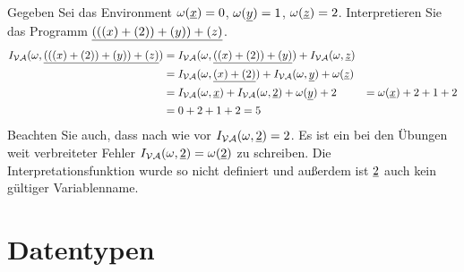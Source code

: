 \begin{bsp}
Gegeben Sei das Environment $\omega(\underline{x})=0$, $\omega(\underline{y})=1$, $\omega(\underline{z})=2$.
Interpretieren Sie das Programm $\underline{(((x)+(2))+(y))+(z)}$.
\begin{align*}
I_{\mathcal{VA}}(\omega,\underline{(((x)+(2))+(y))+(z)}) &= I_{\mathcal{VA}}(\omega,\underline{((x)+(2))+(y)}) + I_{\mathcal{VA}}(\omega,\underline{z}) \\
&= I_{\mathcal{VA}}(\omega,\underline{(x)+(2)}) + I_{\mathcal{VA}}(\omega,\underline{y}) + \omega(\underline{z}) \\
&= I_{\mathcal{VA}}(\omega,\underline{x}) + I_{\mathcal{VA}}(\omega,\underline{2}) + \omega(\underline{y}) + 2
&= \omega(\underline{x}) + 2 + 1 + 2 \\
&= 0 + 2 + 1 + 2 = 5
\end{align*}
Beachten Sie auch, dass nach wie vor $I_{\mathcal{VA}}(\omega,\underline{2})=2$.
Es ist ein bei den Übungen weit verbreiteter Fehler $I_{\mathcal{VA}}(\omega,\underline{2}) = \omega(\underline{2})$ zu schreiben. Die Interpretationsfunktion wurde so nicht definiert und
außerdem ist $\underline{2}$ auch kein gültiger Variablenname.
\end{bsp}

\section{Datentypen}
